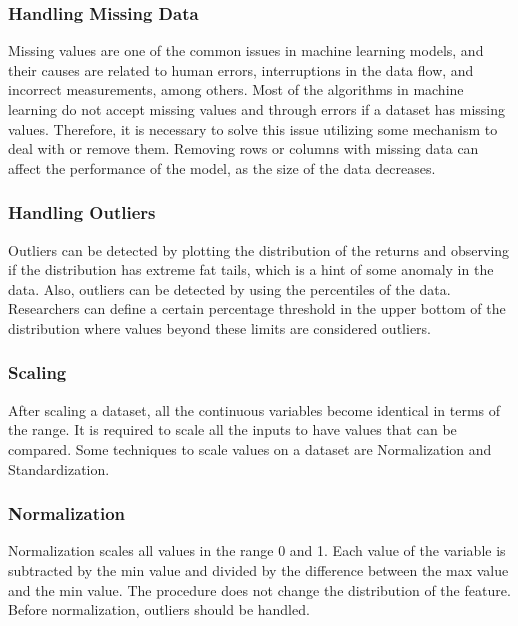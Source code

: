 \documentclass[conference]{IEEEtran}
\begin{document}
\subsubsection{Handling Missing Data}
Missing values are one of the common issues in machine learning models, and their causes are related to human errors, interruptions in the data flow, and incorrect measurements, among others.
Most of the algorithms in machine learning do not accept missing values and through errors if a dataset has missing values.
Therefore, it is necessary to solve this issue utilizing some mechanism to deal with or remove them.
Removing rows or columns with missing data can affect the performance of the model, as the size of the data decreases.

\subsubsection{Handling Outliers}
Outliers can be detected by plotting the distribution of the returns and observing if the distribution has extreme fat tails, which is a hint of some anomaly in the data.
Also, outliers can be detected by using the percentiles of the data.
Researchers can define a certain percentage threshold in the upper bottom of the distribution where values beyond these limits are considered outliers.

\subsubsection{Scaling}
After scaling a dataset, all the continuous variables become identical in terms of the range.
It is required to scale all the inputs to have values that can be compared.
Some techniques to scale values on a dataset are Normalization and Standardization.

\subsubsection{Normalization}
Normalization scales all values in the range 0 and 1.
Each value of the variable is subtracted by the min value and divided by the difference between the max value and the min value.
The procedure does not change the distribution of the feature.
Before normalization, outliers should be handled.

\end{document}
